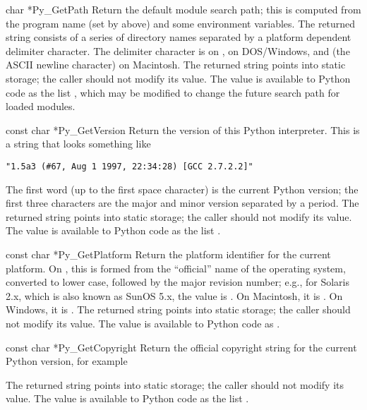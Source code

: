\documentclass[twoside,openright]{report}
\begin{document}
\begin{cfuncdesc}{char *}{Py_GetPath}{}
Return the default module search path; this is computed from the 
program name (set by  above) and some 
environment variables.  The returned string consists of a series of 
directory names separated by a platform dependent delimiter character.  
The delimiter character is  on \UNIX{},  on 
DOS/Windows, and  (the ASCII newline character) on 
Macintosh.  The returned string points into static storage; the caller 
should not modify its value.  The value is available to Python code 
as the list , which may be modified to change the 
future search path for loaded modules.

\end{cfuncdesc}

\begin{cfuncdesc}{const char *}{Py_GetVersion}{}
Return the version of this Python interpreter.  This is a string that 
looks something like

\begin{verbatim}
"1.5a3 (#67, Aug 1 1997, 22:34:28) [GCC 2.7.2.2]"
\end{verbatim}

The first word (up to the first space character) is the current Python 
version; the first three characters are the major and minor version 
separated by a period.  The returned string points into static storage; 
the caller should not modify its value.  The value is available to 
Python code as the list .
\end{cfuncdesc}

\begin{cfuncdesc}{const char *}{Py_GetPlatform}{}
Return the platform identifier for the current platform.  On \UNIX{}, 
this is formed from the ``official'' name of the operating system, 
converted to lower case, followed by the major revision number; e.g., 
for Solaris 2.x, which is also known as SunOS 5.x, the value is 
.  On Macintosh, it is .  On Windows, it 
is .  The returned string points into static storage; 
the caller should not modify its value.  The value is available to 
Python code as .
\end{cfuncdesc}

\begin{cfuncdesc}{const char *}{Py_GetCopyright}{}
Return the official copyright string for the current Python version, 
for example


The returned string points into static storage; the caller should not 
modify its value.  The value is available to Python code as the list 
.
\end{cfuncdesc}
\end{document}
